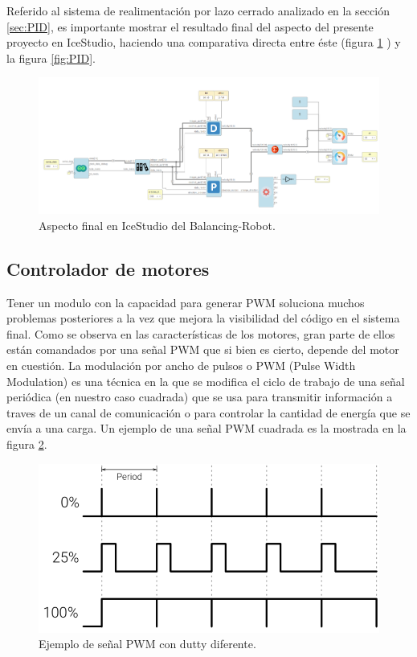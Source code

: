 Referido al sistema de realimentación por lazo cerrado analizado en la sección \ref{sec:PID}, es importante mostrar el resultado final del aspecto del presente proyecto en IceStudio, haciendo una comparativa directa entre éste (figura \ref{fig:finalIceStudio} ) y la figura \ref{fig:PID}.
\newpage
\begin{figure}[H]
	\center
	\includegraphics[scale=0.6, angle=90]{imagenes/Balancing_robot/finalIceStudio}
	\caption{Aspecto final en IceStudio del Balancing-Robot.}
	\label{fig:finalIceStudio}
\end{figure}

\subsection{Controlador de motores} \label{sec:driver_motores}
Tener un modulo con la capacidad para generar PWM soluciona muchos problemas posteriores a la vez que mejora la visibilidad del código en el sistema final. Como se observa en las características de los motores, gran parte de ellos están comandados por una señal PWM que si bien es cierto, depende del motor en cuestión. \newline
La modulación por ancho de pulsos o PWM (Pulse Width Modulation) es una técnica en la que se modifica el ciclo de trabajo de una señal periódica (en nuestro caso cuadrada) que se usa para transmitir información a traves de un canal de comunicación o para controlar la cantidad de energía que se envía a una carga. Un ejemplo de una señal PWM cuadrada es la mostrada en la figura \ref{fig:pwm_example}.

\begin{figure}[H]
	\center
	\includegraphics[trim = 0mm 0cm 0mm 0cm, clip,scale=0.4]{imagenes/Balancing_robot/pwm_example.png}
	\caption{Ejemplo de señal PWM con dutty diferente.}
	\label{fig:pwm_example}
\end{figure}


